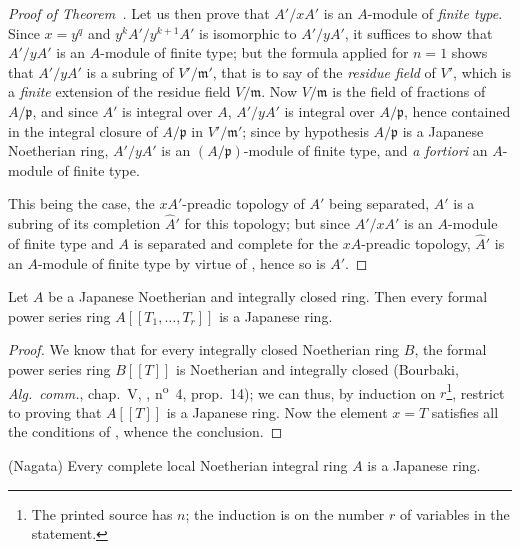 \begin{proof}[Proof of Theorem~{\rm{}}]
Let us then prove that $A'/xA'$ is an $A$-module of \emph{finite type}.
Since $x=y^q$ and $y^kA'/y^{k+1}A'$ is isomorphic to $A'/yA'$, it suffices to show that $A'/yA'$ is an $A$-module of finite type; but the formula  applied for $n=1$ shows that $A'/yA'$ is a subring of $V'/\mathfrak{m}'$, that is to say of the \emph{residue field} of $V'$, which is a \emph{finite} extension of the residue field $V/\mathfrak{m}$.
Now $V/\mathfrak{m}$ is the field of fractions of $A/\mathfrak{p}$, and since $A'$ is integral over $A$, $A'/yA'$ is integral over $A/\mathfrak{p}$, hence contained in the integral closure of $A/\mathfrak{p}$ in $V'/\mathfrak{m}'$; since by hypothesis $A/\mathfrak{p}$ is a Japanese Noetherian ring, $A'/yA'$ is an $(A/\mathfrak{p})$-module of finite type, and \emph{a fortiori} an $A$-module of finite type.

This being the case, the $xA'$-preadic topology of $A'$ being separated, $A'$ is a subring of its completion $\hat{A}'$ for this topology; but since $A'/xA'$ is an $A$-module of finite type and $A$ is separated and complete for the $xA$-preadic topology, $\hat{A}'$ is an $A$-module of finite type by virtue of , hence so is $A'$.
\end{proof}

\begin{corollary}[23.1.4]
\label{0.23.1.4}
Let $A$ be a Japanese Noetherian and integrally closed ring.
Then every formal power series ring $A[[T_1,\ldots,T_r]]$ is a Japanese ring.
\end{corollary}

\begin{proof}
We know that for every integrally closed Noetherian ring $B$, the formal power series ring $B[[T]]$ is Noetherian and integrally closed (Bourbaki, \emph{Alg.~comm.}, chap.~V, , n\textsuperscript{o}~4, prop.~14); we can thus, by induction on $r$\footnote{The printed source has $n$; the induction is on the number $r$ of variables in the statement.}, restrict to proving that $A[[T]]$ is a Japanese ring.
Now the element $x=T$ satisfies all the conditions of , whence the conclusion.
\end{proof}

\begin{theorem}[23.1.5]
\label{0.23.1.5}
\textnormal{(Nagata)}
Every \textup{complete} local Noetherian integral ring $A$ is a Japanese ring.
\end{theorem}

